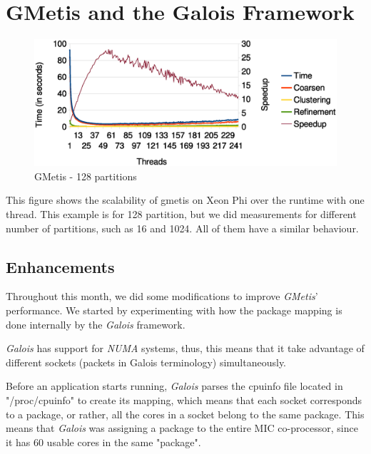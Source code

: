 \documentclass[abstract=on,9pt,twocolumn]{scrartcl}
\begin{document}

\section{GMetis and the Galois Framework} %
\label{sec:GMetis}

\begin{center}
\begin{figure}[htb]
    \includegraphics[width=\columnwidth]{img/gmetis128.eps}
    \caption{GMetis - 128 partitions}
    \label{gmetis128}
\end{figure}
\end{center}

This figure shows the scalability of gmetis on Xeon Phi over the runtime
with one thread. This example is for 128 partition, but we did
measurements for different number of partitions, such as 16 and 1024. All
of them have a similar behaviour.


\subsection{Enhancements}

Throughout this month, we did some modifications to improve
\textit{GMetis}' performance. We started by experimenting with how the package mapping
is done internally by the \textit{Galois} framework.

\textit{Galois} has support for \textit{NUMA} systems, thus, this means that
it take advantage of different sockets (packets in Galois terminology) simultaneously.

Before an application starts running, \textit{Galois} parses the
cpuinfo file located in "/proc/cpuinfo" to create its mapping, which means that each socket
corresponds to a package, or rather, all the cores in a socket belong to the same package.
This means that \textit{Galois} was assigning a package to the entire MIC co-processor, since it has 60 usable cores in the same "package".
\end{document}
